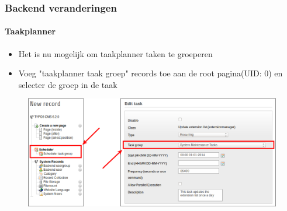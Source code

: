 \begin{frame}[fragile]
	\frametitle{Backend veranderingen}
	\framesubtitle{Taakplanner}

	\begin{itemize}
		\item Het is nu mogelijk om taakplanner taken te groeperen 
		\item Voeg "taakplanner taak groep" records toe aan de root pagina(UID: 0)\newline
			en selecter de groep in de taak
	\end{itemize}

	\begin{figure}
		\includegraphics[width=0.85\linewidth]{Images/BackendChanges/SchedulerTaskGroup.png}
	\end{figure}

\end{frame}


